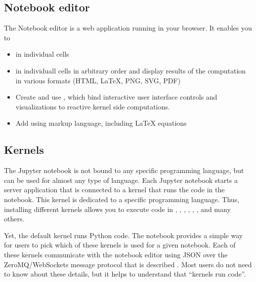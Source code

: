 \documentclass[letterpaper,10pt,english]{sphinxmanual}
\begin{document}
\subsection{Notebook editor}
\label{\detokenize{notebooks/Intro/Introduction2Jupyter:Notebook-editor}}
The Notebook editor is a web application running in your browser. It enables you to
\begin{itemize}
\item {} 
 in individual cells

\item {} 
 in individuall cells in arbitrary order and display results of the computation in various formats (HTML, LaTeX, PNG, SVG, PDF)

\item {} 
Create and use , which bind interactive user interface controls and visualizations to reactive kernel side computations.

\item {} 
Add  using  markup language, including LaTeX equations

\end{itemize}


\subsection{Kernels}
\label{\detokenize{notebooks/Intro/Introduction2Jupyter:Kernels}}
The Jupyter notebook is not bound to any specific programming language, but can be used for almost any type of language. Each Jupyter notebook starts a server application that is connected to a kernel that runs the code in the notebook. This kernel is dedicated to a specific programming language. Thus, installing different kernels  allows you to execute code in , , , , ,
, and many others.

Yet, the default kernel runs Python code. The notebook provides a simple way for users to pick which of these kernels is used for a given notebook. Each of these kernels communicate with the notebook editor using JSON over the ZeroMQ/WebSockets message protocol that is described . Most users do not need to know about these details, but it helps to understand that “kernels run code”.
\end{document}

